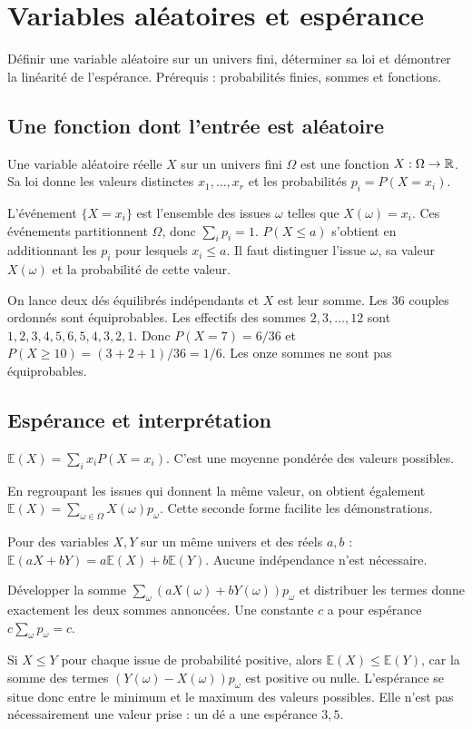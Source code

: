 \documentclass[../cours_1re.tex]{subfiles}
\begin{document}
\setcounter{chapter}{20}
\chapter{Variables aléatoires et espérance}
\label{ch:21}
\begin{objectif}
Définir une variable aléatoire sur un univers fini, déterminer sa loi et démontrer la linéarité de l'espérance.
Prérequis : probabilités finies, sommes et fonctions.
\end{objectif}
\section{Une fonction dont l'entrée est aléatoire}
\begin{definition}
Une variable aléatoire réelle $X$ sur un univers fini $\Omega$ est une fonction
$X:\Omega\to\mathbb{R}$. Sa loi donne les valeurs distinctes $x_1,\ldots,x_r$
et les probabilités $p_i=P(X=x_i)$.
\end{definition}
L'événement $\{X=x_i\}$ est l'ensemble des issues $\omega$ telles que
$X(\omega)=x_i$. Ces événements partitionnent $\Omega$, donc $\sum_ip_i=1$.
$P(X\le a)$ s'obtient en additionnant les $p_i$ pour lesquels $x_i\le a$.
Il faut distinguer l'issue $\omega$, sa valeur $X(\omega)$ et la probabilité
de cette valeur.

\begin{exemple}
On lance deux dés équilibrés indépendants et $X$ est leur somme.
Les $36$ couples ordonnés sont équiprobables. Les effectifs des sommes
$2,3,\ldots,12$ sont $1,2,3,4,5,6,5,4,3,2,1$.
Donc $P(X=7)=6/36$ et $P(X\ge10)=(3+2+1)/36=1/6$.
Les onze sommes ne sont pas équiprobables.
\end{exemple}

\section{Espérance et interprétation}
\begin{definition}
$\displaystyle \mathbb E(X)=\sum_i x_iP(X=x_i)$.
C'est une moyenne pondérée des valeurs possibles.
\end{definition}
En regroupant les issues qui donnent la même valeur, on obtient également
$\mathbb E(X)=\sum_{\omega\in\Omega}X(\omega)p_\omega$.
Cette seconde forme facilite les démonstrations.
\begin{propriete}[linéarité]
Pour des variables $X,Y$ sur un même univers et des réels $a,b$ :
$\mathbb E(aX+bY)=a\mathbb E(X)+b\mathbb E(Y)$.
Aucune indépendance n'est nécessaire.
\end{propriete}
\begin{demonstration}
Développer la somme
$\sum_\omega(aX(\omega)+bY(\omega))p_\omega$ et distribuer les termes
donne exactement les deux sommes annoncées.
Une constante $c$ a pour espérance $c\sum_\omega p_\omega=c$.
\end{demonstration}
Si $X\le Y$ pour chaque issue de probabilité positive, alors
$\mathbb E(X)\le\mathbb E(Y)$, car la somme des termes
$(Y(\omega)-X(\omega))p_\omega$ est positive ou nulle.
L'espérance se situe donc entre le minimum et le maximum des valeurs possibles.
Elle n'est pas nécessairement une valeur prise : un dé a une espérance $3{,}5$.
\end{document}
